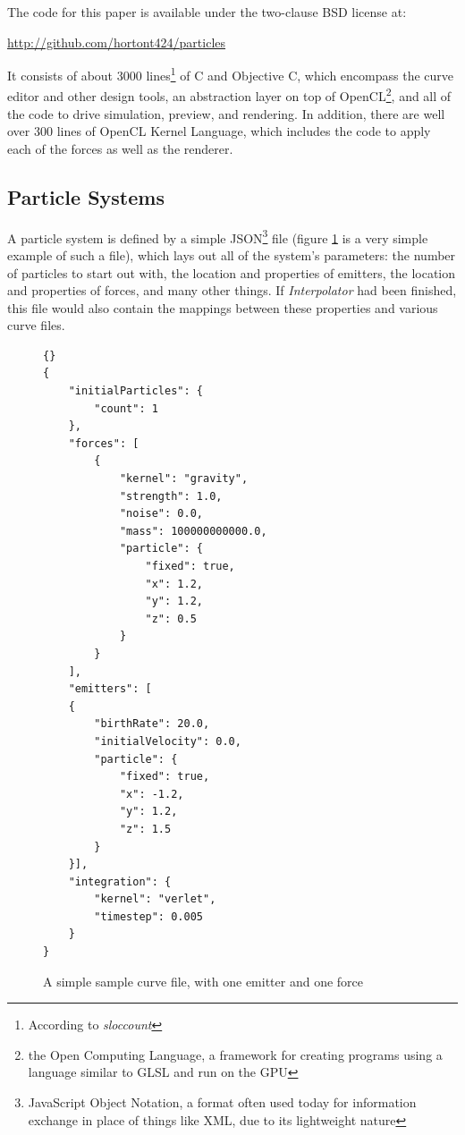 \documentclass{acmsiggraph}
\begin{document}
The code for this paper is available under the two-clause BSD license at:

\url{http://github.com/hortont424/particles}

It consists of about 3000 lines\footnote{According to {\it sloccount}} of C and Objective C, which encompass the curve editor and other design tools, an abstraction layer on top of OpenCL\footnote{the Open Computing Language, a framework for creating programs using a language similar to GLSL and run on the GPU}, and all of the code to drive simulation, preview, and rendering. In addition, there are well over 300 lines of OpenCL Kernel Language, which includes the code to apply each of the forces as well as the renderer.

\subsection{Particle Systems}

A particle system is defined by a simple JSON\footnote{JavaScript Object Notation, a format often used today for information exchange in place of things like XML, due to its lightweight nature} file (figure \ref{curveListing} is a very simple example of such a file), which lays out all of the system's parameters: the number of particles to start out with, the location and properties of emitters, the location and properties of forces, and many other things. If {\it Interpolator} had been finished, this file would also contain the mappings between these properties and various curve files.

\begin{figure}

    \lstset{language=Python}
    \lstset{basicstyle=\footnotesize\ttfamily}
    \lstset{numbers=left, numberstyle=\tiny, stepnumber=1, numbersep=5pt}
    \begin{lstlisting}[frame=trbl]{}
{
    "initialParticles": {
        "count": 1
    },
    "forces": [
        {
            "kernel": "gravity",
            "strength": 1.0,
            "noise": 0.0,
            "mass": 100000000000.0,
            "particle": {
                "fixed": true,
                "x": 1.2,
                "y": 1.2,
                "z": 0.5
            }
        }
    ],
    "emitters": [
    {
        "birthRate": 20.0,
        "initialVelocity": 0.0,
        "particle": {
            "fixed": true,
            "x": -1.2,
            "y": 1.2,
            "z": 1.5
        }
    }],
    "integration": {
        "kernel": "verlet",
        "timestep": 0.005
    }
}
    \end{lstlisting}

    \caption{A simple sample curve file, with one emitter and one force}
    \label{curveListing}
\end{figure}
\end{document}
